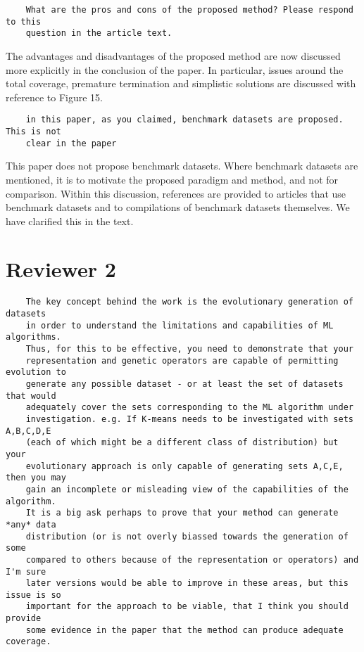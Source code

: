 \documentclass[11pt]{article}
\begin{document}
\begin{tcolorbox}
\begin{verbatim}
    What are the pros and cons of the proposed method? Please respond to this
    question in the article text.
\end{verbatim}
\end{tcolorbox}

The advantages and disadvantages of the proposed method are now discussed more
explicitly in the conclusion of the paper. In particular, issues around the
total coverage, premature termination and simplistic solutions are discussed
with reference to Figure 15.\\

\begin{tcolorbox}
\begin{verbatim}
    in this paper, as you claimed, benchmark datasets are proposed. This is not
    clear in the paper
\end{verbatim}
\end{tcolorbox}

This paper does not propose benchmark datasets. Where benchmark datasets are
mentioned, it is to motivate the proposed paradigm and method, and not for
comparison. Within this discussion, references are provided to articles that use
benchmark datasets and to compilations of benchmark datasets themselves. We have
clarified this in the text.


\section*{Reviewer 2}

\begin{tcolorbox}
\begin{verbatim}
    The key concept behind the work is the evolutionary generation of datasets
    in order to understand the limitations and capabilities of ML algorithms.
    Thus, for this to be effective, you need to demonstrate that your
    representation and genetic operators are capable of permitting evolution to
    generate any possible dataset - or at least the set of datasets that would
    adequately cover the sets corresponding to the ML algorithm under
    investigation. e.g. If K-means needs to be investigated with sets A,B,C,D,E
    (each of which might be a different class of distribution) but your
    evolutionary approach is only capable of generating sets A,C,E, then you may
    gain an incomplete or misleading view of the capabilities of the algorithm.
    It is a big ask perhaps to prove that your method can generate *any* data
    distribution (or is not overly biassed towards the generation of some
    compared to others because of the representation or operators) and I'm sure
    later versions would be able to improve in these areas, but this issue is so
    important for the approach to be viable, that I think you should provide
    some evidence in the paper that the method can produce adequate coverage.
\end{verbatim}
\end{tcolorbox}
\end{document}
